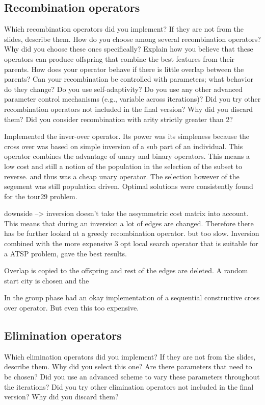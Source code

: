 \documentclass[a4paper,10pt]{article}
\newcommand{\ReplaceMe}[1]{{\color{blue}#1}}
\begin{document}
\subsection{Recombination operators}

\ReplaceMe{Which recombination operators did you implement? If they are not from the slides, describe them. How do you choose among several recombination operators? Why did you choose these ones specifically? Explain how you believe that these operators can produce offspring that combine the best features from their parents. How does your operator behave if there is little overlap between the parents? Can your recombination be controlled with parameters; what behavior do they change? Do you use self-adaptivity? Do you use any other advanced parameter control mechanisms (e.g., variable across iterations)? Did you try other recombination operators not included in the final version? Why did you discard them? Did you consider recombination with arity strictly greater than 2?}



Implemented the inver-over operator. Its power was its simpleness because the cross over was based on simple inversion of a sub part of an individual. This operator combines the advantage of unary and binary operators. This means a low cost and still a notion of the population in the selection of the subset to reverse. and thus was a cheap unary operator. The selection however of the segement was still population driven. Optimal solutions were consistently found for the tour29 problem. 

downside --> inversion doesn't take the assymmetric cost matrix into account. This means that during an inversion a lot of edges are changed. Therefore there has be further looked at a greedy recombination operator. but too slow. Inversion combined with the more expensive 3 opt local search operator that is suitable for a ATSP problem, gave the best results. 

Overlap is copied to the offspring and rest of the edges are deleted. A random start city is chosen and the 

In the group phase had an okay implementation of a sequential constructive cross over operator. But even this too expensive. 

\subsection{Elimination operators}

\ReplaceMe{Which elimination operators did you implement? If they are not from the slides, describe them. Why did you select this one? Are there parameters that need to be chosen? Did you use an advanced scheme to vary these parameters throughout the iterations? Did you try other elimination operators not included in the final version? Why did you discard them?} 
\end{document}
